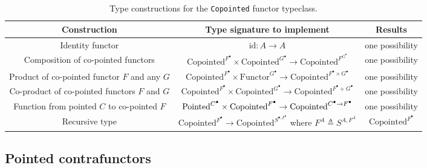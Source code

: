\begin{table}
\begin{centering}
\begin{tabular}{|c|c|c|}
\hline 
\textbf{\footnotesize{}Construction} & \textbf{\footnotesize{}Type signature to implement} & \textbf{\footnotesize{}Results}\tabularnewline
\hline 
\hline 
{\footnotesize{}Identity functor} & {\footnotesize{}$\text{id}:A\rightarrow A$} & {\footnotesize{}one possibility}\tabularnewline
\hline 
{\footnotesize{}Composition of co-pointed functors} & {\footnotesize{}$\text{Copointed}^{F^{\bullet}}\times\text{Copointed}^{G^{\bullet}}\rightarrow\text{Copointed}^{F^{G^{\bullet}}}$} & {\footnotesize{}one possibility}\tabularnewline
\hline 
{\footnotesize{}Product of co-pointed functor $F$ and any $G$} & {\footnotesize{}$\text{Copointed}^{F^{\bullet}}\times\text{Functor}^{G^{\bullet}}\rightarrow\text{Copointed}^{F^{\bullet}\times G^{\bullet}}$} & {\footnotesize{}one possibility}\tabularnewline
\hline 
{\footnotesize{}Co-product of co-pointed functors $F$ and $G$} & {\footnotesize{}$\text{Copointed}^{F^{\bullet}}\times\text{Copointed}^{G^{\bullet}}\rightarrow\text{Copointed}^{F^{\bullet}+G^{\bullet}}$} & {\footnotesize{}one possibility}\tabularnewline
\hline 
{\footnotesize{}Function from pointed $C$ to co-pointed $F$} & {\footnotesize{}$\text{\ensuremath{\text{Pointed}^{C^{\bullet}}}}\times\text{Copointed}^{F^{\bullet}}\rightarrow\text{Copointed}^{C^{\bullet}\rightarrow F^{\bullet}}$} & {\footnotesize{}one possibility}\tabularnewline
\hline 
{\footnotesize{}Recursive type} & {\footnotesize{}$\text{Copointed}^{F^{\bullet}}\rightarrow\text{Copointed}^{S^{\bullet,F^{\bullet}}}$
where $F^{A}\triangleq S^{A,F^{A}}$} & {\footnotesize{}$\text{Copointed}^{F^{\bullet}}$}\tabularnewline
\hline 
\end{tabular}
\par\end{centering}
\caption{Type constructions for the \lstinline!Copointed! functor typeclass.\label{tab:Type-constructions-for-copointed-functor}}
\end{table}


\subsection{Pointed contrafunctors\label{subsec:Pointed-contrafunctors}}

